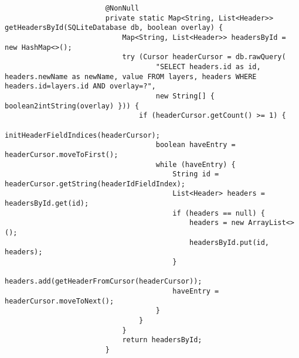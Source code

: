 \begin{enumerate}
\begin{itemize}
\begin{verbatim}
                        @NonNull
                        private static Map<String, List<Header>> getHeadersById(SQLiteDatabase db, boolean overlay) {
                            Map<String, List<Header>> headersById = new HashMap<>();
                            try (Cursor headerCursor = db.rawQuery(
                                    "SELECT headers.id as id, headers.newName as newName, value FROM layers, headers WHERE headers.id=layers.id AND overlay=?",
                                    new String[] { boolean2intString(overlay) })) {
                                if (headerCursor.getCount() >= 1) {
                                    initHeaderFieldIndices(headerCursor);
                                    boolean haveEntry = headerCursor.moveToFirst();
                                    while (haveEntry) {
                                        String id = headerCursor.getString(headerIdFieldIndex);
                                        List<Header> headers = headersById.get(id);
                                        if (headers == null) {
                                            headers = new ArrayList<>();
                                            headersById.put(id, headers);
                                        }
                                        headers.add(getHeaderFromCursor(headerCursor));
                                        haveEntry = headerCursor.moveToNext();
                                    }
                                }
                            }
                            return headersById;
                        }
                    \end{verbatim}
          \end{itemize}
\end{enumerate}